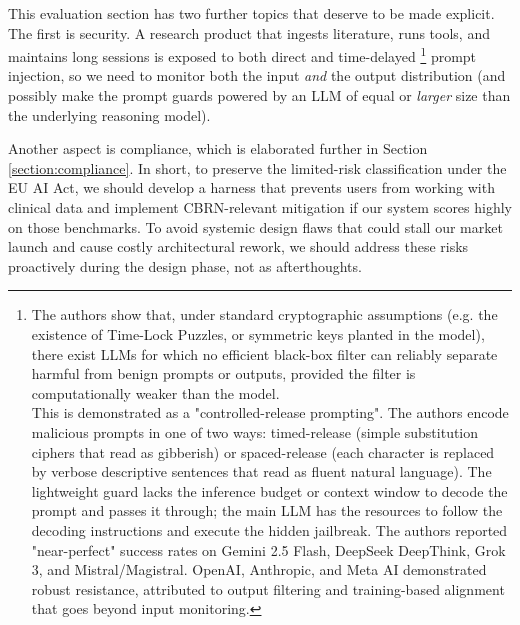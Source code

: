 This evaluation section has two further topics that deserve to be made explicit. The first is security. A research product that ingests literature, runs tools, and maintains long sessions is exposed to both direct and time-delayed \cite{2507.07341, 2510.01529}\footnote{
    The authors show that, under standard cryptographic assumptions (e.g. the existence of Time-Lock Puzzles, or symmetric keys planted in the model), there exist LLMs for which no efficient black-box filter can reliably separate harmful from benign prompts or outputs, provided the filter is computationally weaker than the model.
    \\
    This is demonstrated as a "controlled-release prompting". The authors encode malicious prompts in one of two ways: timed-release (simple substitution ciphers that read as gibberish) or spaced-release (each character is replaced by verbose descriptive sentences that read as fluent natural language). The lightweight guard lacks the inference budget or context window to decode the prompt and passes it through; the main LLM has the resources to follow the decoding instructions and execute the hidden jailbreak.
    The authors reported "near-perfect" success rates on Gemini 2.5 Flash, DeepSeek DeepThink, Grok 3, and Mistral/Magistral. OpenAI, Anthropic, and Meta AI demonstrated robust resistance, attributed to output filtering and training-based alignment that goes beyond input monitoring.
    }
prompt injection, so we need to monitor both the input \emph{and} the output distribution (and possibly make the prompt guards powered by an LLM of equal or \emph{larger} size than the underlying reasoning model).

Another aspect is compliance, which is elaborated further in Section \ref{section:compliance}. In short, to preserve the limited-risk classification under the EU AI Act, we should develop a harness that prevents users from working with clinical data and implement CBRN-relevant mitigation if our system scores highly on those benchmarks. To avoid systemic design flaws that could stall our market launch and cause costly architectural rework, we should address these risks proactively during the design phase, not as afterthoughts.

